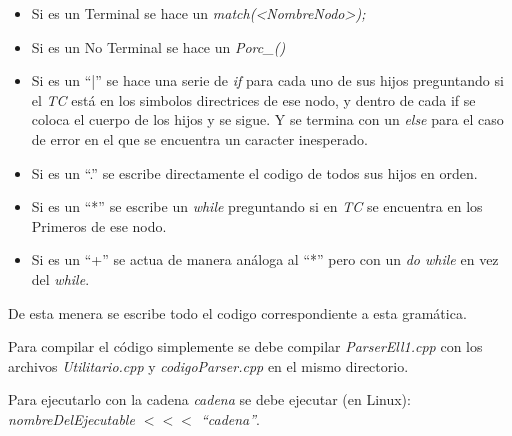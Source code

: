 \documentclass[a4paper]{report}
\begin{document}
\begin{itemize}
\item Si es un Terminal se hace un \emph{match(<NombreNodo>);}
\item Si es un No Terminal se hace un \emph{Porc\_<Nombre Nodo>()}
\item Si es un ``|'' se hace una serie de \emph{if} para cada uno de sus hijos preguntando si el \emph{TC} está en los simbolos directrices de ese nodo, y dentro de cada if se coloca el cuerpo de los hijos y se sigue. Y se termina con un \emph{else} para el caso de error en el que se encuentra un caracter inesperado.
\item Si es un ``.'' se escribe directamente el codigo de todos sus hijos en orden.
\item Si es un ``*'' se escribe un \emph{while} preguntando si en \emph{TC} se encuentra en los Primeros de ese nodo.
\item Si es un ``+'' se actua de manera análoga al ``*'' pero con un \emph{do while} en vez del \emph{while}.
\end{itemize}


De esta menera se escribe todo el codigo correspondiente a esta gramática.


Para compilar el código simplemente se debe compilar \emph{ParserEll1.cpp} con los archivos \emph{Utilitario.cpp} y \emph{codigoParser.cpp} en el mismo directorio.


Para ejecutarlo con la cadena \emph{cadena} se debe ejecutar (en Linux): \emph{nombreDelEjecutable  $<<<$  ``cadena''}.
\end{document}

